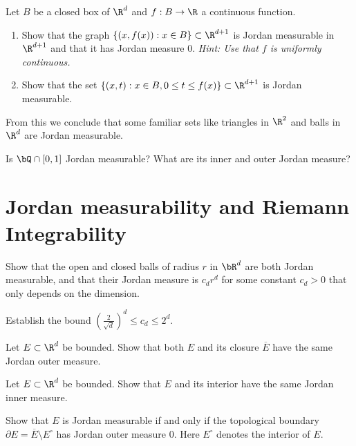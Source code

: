 \documentclass[lang=cn,11pt]{template}
\begin{document}
 
 
 Let $B$ be a closed box of $\R^d$ and $f: B\to \R$ a continuous function. 

 \begin{enumerate}
 \item Show that the graph $\{(x, f(x)): x\in B\}\subset \R^{d+1}$ is Jordan measurable in $\R^{d+1}$ and that it has Jordan measure 0. \emph{Hint: Use that $f$ is uniformly continuous.}
 \item Show that the set $\{(x, t):x\in B, 0\leq t \leq f(x)\}\subset \R^{d+1}$ is Jordan measurable. 
\end{enumerate} 

From this we conclude that some familiar sets like triangles in $\R^2$ and balls in $\R^d$ are Jordan measurable. 

 Is $\bQ \cap [0,1]$ Jordan measurable? What are its inner and outer Jordan measure?




\newpage
\chapter{Jordan measurability and Riemann Integrability}


 Show that the open and closed balls of radius $r$ in $\bR^d$ are both Jordan measurable, and that their Jordan measure is $c_d r^d$ for some constant $c_d>0$ that only depends on the dimension.
 

 Establish the bound $\left(\frac{2}{\sqrt d}\right)^d \leq c_d\leq 2^d$. 

 Let $E \subset \R^d$ be bounded. Show that both $E$ and its closure $\overline E$ have the same Jordan outer measure. 

 Let $E \subset \R^d$ be bounded.  Show that $E$ and its interior have the same Jordan inner measure. 

 Show that $E$ is Jordan measurable if and only if the topological boundary $\partial E=\overline E\setminus E^\circ$ has Jordan outer measure 0. Here $E^\circ$ denotes the interior of $E$. 
\end{document}
